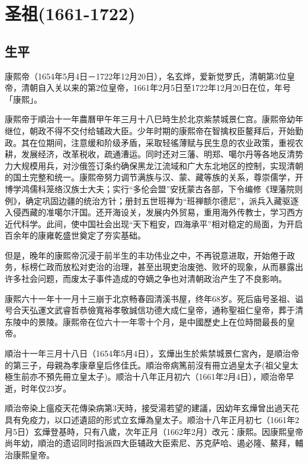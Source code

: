 
\section{圣祖\tiny(1661-1722)}

\subsection{生平}

康熙帝（1654年5月4日－1722年12月20日），名玄烨，爱新觉罗氏，清朝第3位皇帝，清朝自入关以来的第2位皇帝，1661年2月5日至1722年12月20日在位，年号「康熙」。

康熙帝于順治十一年農曆甲午年三月十八巳時生於北京紫禁城景仁宫。康熙帝幼年继位，朝政不得不交付给辅政大臣。少年时期的康熙帝在智擒权臣鳌拜后，开始勤政。其在位期间，注意缓和阶级矛盾，采取轻徭薄赋与民生息的农业政策，重视农耕，发展经济，改革税收，疏通漕运。同时还对三藩、明郑、噶尔丹等各地反清势力大规模用兵，对沙俄签订条约确保黑龙江流域和广大东北地区的控制，实现清朝的国土完整和统一。康熙帝努力调节满族与汉、蒙、藏等族的关系，尊崇儒学，开博学鸿儒科笼络汉族士大夫；实行“多伦会盟”安抚蒙古各部，下令编修《理藩院则例》，确定巩固边疆的统治方针；册封五世班禅为“班禅额尔德尼”，派兵入藏驱逐入侵西藏的准噶尔汗国。还开海设关，发展内外贸易，重用海外传教士，学习西方近代科学。此间，使中国社会出现“天下粗安，四海承平”相对稳定的局面，为开启百余年的康雍乾盛世奠定了夯实基础。

但是，晚年的康熙帝沉浸于前半生的丰功伟业之中，不再锐意进取，开始倦于政务，标榜仁政而放松对吏治的治理，甚至出現吏治废弛、败坏的现象，从而暴露出许多社会问题，而废太子事件造成的夺嫡之争也对清朝政治产生了不良影响。

康熙六十一年十一月十三崩于北京畅春园清溪书屋，终年68岁。死后庙号圣祖、谥号合天弘運文武睿哲恭儉寬裕孝敬誠信功德大成仁皇帝，通称聖祖仁皇帝，葬于清东陵中的景陵。康熙帝在位六十一年零十个月，是中國歷史上在位時間最長的皇帝。

順治十一年三月十八日（1654年5月4日），玄燁出生於紫禁城景仁宮內，是順治帝的第三子，母親為孝康章皇后佟佳氏。順治帝病篤前沒有冊立過皇太子(祖父皇太極生前亦不預先冊立皇太子)。顺治十八年正月初六（1661年2月4日），顺治帝早逝，时年仅23岁。

順治帝染上瘟疫天花傳染病第3天時，接受湯若望的建議，因幼年玄燁曾出過天花具有免疫力，以口述遺詔的形式立玄燁為皇太子。顺治十八年正月初七（1661年2月5日）玄燁登基時，只有八歲，次年正月（1662年2月）改元：康熙。因康熙皇帝尚年幼，順治的遗诏同时指派四大臣辅政大臣索尼、苏克萨哈、遏必隆、鰲拜，輔治康熙皇帝。

